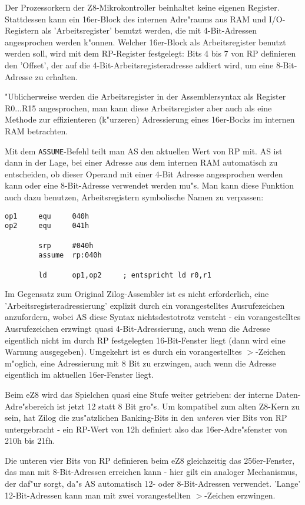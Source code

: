 \documentclass[12pt,a4paper,twoside]{report}
\newcommand{\tty}[1]{{\tt #1}}
\begin{document}
{Der Prozessorkern der Z8-Mikrokontroller beinhaltet keine eigenen
Register.  Stattdessen kann ein 16er-Block des internen Adre"raums
aus RAM und I/O-Registern als 'Arbeitsregister' benutzt werden, die
mit 4-Bit-Adressen angesprochen werden k"onnen.  Welcher 16er-Block
als Arbeitsregister benutzt werden soll, wird mit dem RP-Register
festgelegt: Bits 4 bis 7 von RP definieren den 'Offset', der auf die
4-Bit-Arbeitsregisteradresse addiert wird, um eine 8-Bit-Adresse zu
erhalten.

"Ublicherweise werden die Arbeitsregister in der Assemblersyntax als
Register R0...R15 angesprochen, man kann diese Arbeitsregister aber
auch als eine Methode zur effizienteren (k"urzeren) Adressierung eines
16er-Bocks im internen RAM betrachten.

Mit dem \tty{ASSUME}-Befehl teilt man AS den aktuellen Wert von RP mit.  AS
ist dann in der Lage, bei einer Adresse aus dem internen RAM
automatisch zu entscheiden, ob dieser Operand mit einer 4-Bit Adresse
angesprochen werden kann oder eine 8-Bit-Adresse verwendet werden
mu"s.  Man kann diese Funktion auch dazu benutzen, Arbeitsregistern
symbolische Namen zu verpassen:
\begin{verbatim}
op1     equ     040h
op2     equ     041h

        srp     #040h
        assume  rp:040h

        ld      op1,op2		; entspricht ld r0,r1
\end{verbatim}
Im Gegensatz zum Original Zilog-Assembler ist es nicht erforderlich,
eine 'Arbeitsregisteradressierung' explizit durch ein vorangestelltes
Ausrufezeichen anzufordern, wobei AS diese Syntax nichtsdestotrotz
versteht - ein vorangestelltes Ausrufezeichen erzwingt quasi
4-Bit-Adressierung, auch wenn die Adresse eigentlich nicht im durch
RP festgelegten 16-Bit-Fenster liegt (dann wird eine Warnung
ausgegeben).  Umgekehrt ist es durch ein vorangestelltes $>$-Zeichen
m"oglich, eine Adressierung mit 8 Bit zu erzwingen, auch wenn die
Adresse eigentlich im aktuellen 16er-Fenster liegt.

Beim eZ8 wird das Spielchen quasi eine Stufe weiter getrieben: der
interne Daten-Adre"sbereich ist jetzt 12 statt 8 Bit gro"s.  Um
kompatibel zum alten Z8-Kern zu sein, hat Zilog die zus"atzlichen
Banking-Bits in den {\em unteren} vier Bits von RP untergebracht -
ein RP-Wert von 12h definiert also das 16er-Adre"sfenster von 210h
bis 21fh.

Die unteren vier Bits von RP definieren beim eZ8 gleichzeitig das
256er-Fenster, das man mit 8-Bit-Adressen erreichen kann - hier gilt
ein analoger Mechanismus, der daf"ur sorgt, da"s AS automatisch 12-
oder 8-Bit-Adressen verwendet.  'Lange' 12-Bit-Adressen kann man mit
zwei vorangestellten $>$-Zeichen erzwingen.

}
\end{document}
